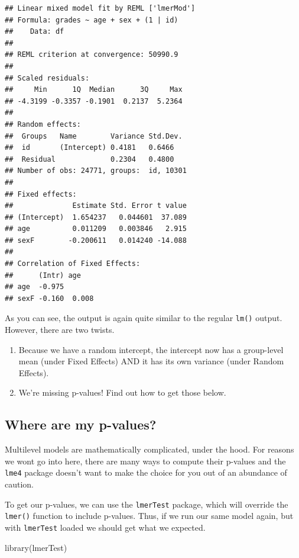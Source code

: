 \documentclass[
]{book}
\newenvironment{Shaded}{\begin{snugshade}}{\end{snugshade}}
\newcommand{\FunctionTok}[1]{\textcolor[rgb]{0.00,0.00,0.00}{#1}}
\newcommand{\NormalTok}[1]{#1}
\providecommand{\tightlist}{%
  \setlength{\itemsep}{0pt}\setlength{\parskip}{0pt}}
\begin{document}
\begin{verbatim}
## Linear mixed model fit by REML ['lmerMod']
## Formula: grades ~ age + sex + (1 | id)
##    Data: df
## 
## REML criterion at convergence: 50990.9
## 
## Scaled residuals: 
##     Min      1Q  Median      3Q     Max 
## -4.3199 -0.3357 -0.1901  0.2137  5.2364 
## 
## Random effects:
##  Groups   Name        Variance Std.Dev.
##  id       (Intercept) 0.4181   0.6466  
##  Residual             0.2304   0.4800  
## Number of obs: 24771, groups:  id, 10301
## 
## Fixed effects:
##              Estimate Std. Error t value
## (Intercept)  1.654237   0.044601  37.089
## age          0.011209   0.003846   2.915
## sexF        -0.200611   0.014240 -14.088
## 
## Correlation of Fixed Effects:
##      (Intr) age   
## age  -0.975       
## sexF -0.160  0.008
\end{verbatim}

As you can see, the output is again quite similar to the regular \texttt{lm()} output. However, there are two twists.

\begin{enumerate}
\def\labelenumi{\arabic{enumi}.}
\tightlist
\item
  Because we have a random intercept, the intercept now has a group-level mean (under Fixed Effects) AND it has its own variance (under Random Effects).
\item
  We're missing p-values! Find out how to get those below.
\end{enumerate}

\hypertarget{where-are-my-p-values}{%
\subsection{Where are my p-values?}\label{where-are-my-p-values}}

Multilevel models are mathematically complicated, under the hood. For reasons we wont go into here, there are many ways to compute their p-values and the \texttt{lme4} package doesn't want to make the choice for you out of an abundance of caution.

To get our p-values, we can use the \texttt{lmerTest} package, which will override the \texttt{lmer()} function to include p-values. Thus, if we run our same model again, but with \texttt{lmerTest} loaded we should get what we expected.

\begin{Shaded}
\begin{Highlighting}[]
\FunctionTok{library}\NormalTok{(lmerTest)}
\end{Highlighting}
\end{Shaded}
\end{document}
